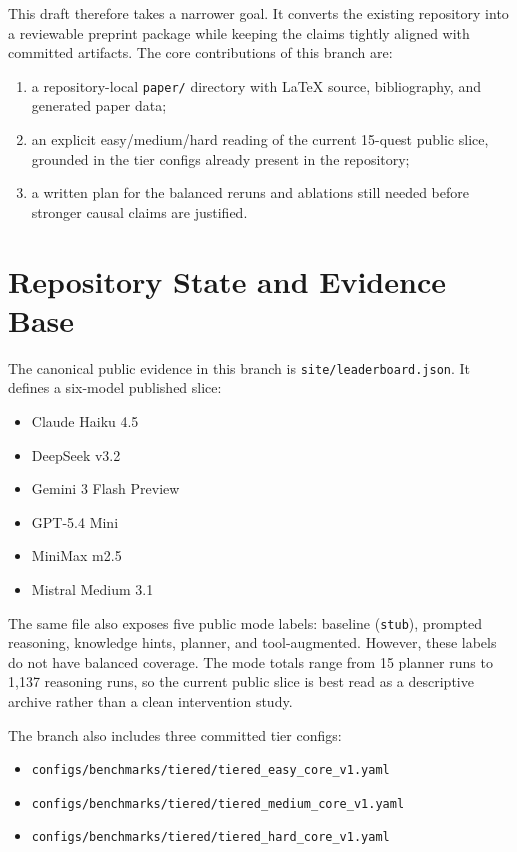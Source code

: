 \documentclass[11pt]{article}
\begin{document}
This draft therefore takes a narrower goal. It converts the existing repository into a reviewable preprint package while keeping the claims tightly aligned with committed artifacts. The core contributions of this branch are:

\begin{enumerate}[leftmargin=1.5em]
  \item a repository-local \texttt{paper/} directory with LaTeX source, bibliography, and generated paper data;
  \item an explicit easy/medium/hard reading of the current 15-quest public slice, grounded in the tier configs already present in the repository;
  \item a written plan for the balanced reruns and ablations still needed before stronger causal claims are justified.
\end{enumerate}

\section{Repository State and Evidence Base}

The canonical public evidence in this branch is \texttt{site/leaderboard.json}. It defines a six-model published slice:

\begin{itemize}[leftmargin=1.5em]
  \item Claude Haiku 4.5
  \item DeepSeek v3.2
  \item Gemini 3 Flash Preview
  \item GPT-5.4 Mini
  \item MiniMax m2.5
  \item Mistral Medium 3.1
\end{itemize}

The same file also exposes five public mode labels: baseline (\texttt{stub}), prompted reasoning, knowledge hints, planner, and tool-augmented. However, these labels do not have balanced coverage. The mode totals range from 15 planner runs to 1{,}137 reasoning runs, so the current public slice is best read as a descriptive archive rather than a clean intervention study.

The branch also includes three committed tier configs:

\begin{itemize}[leftmargin=1.5em]
  \item \texttt{configs/benchmarks/tiered/tiered\_easy\_core\_v1.yaml}
  \item \texttt{configs/benchmarks/tiered/tiered\_medium\_core\_v1.yaml}
  \item \texttt{configs/benchmarks/tiered/tiered\_hard\_core\_v1.yaml}
\end{itemize}
\end{document}
